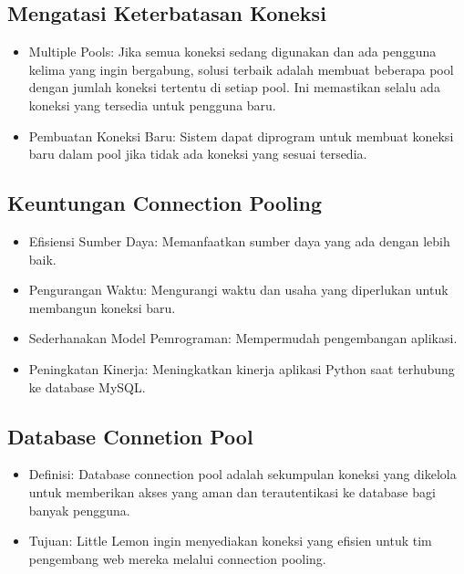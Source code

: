 \documentclass{article}
\begin{document}
\subsection{Mengatasi Keterbatasan Koneksi}
\begin{itemize}
      \item Multiple Pools: Jika semua koneksi sedang digunakan dan ada pengguna kelima yang ingin bergabung, solusi terbaik adalah membuat beberapa pool dengan jumlah koneksi tertentu di setiap pool. Ini memastikan selalu ada koneksi yang tersedia untuk pengguna baru.
      \item Pembuatan Koneksi Baru: Sistem dapat diprogram untuk membuat koneksi baru dalam pool jika tidak ada koneksi yang sesuai tersedia.
\end{itemize}

\subsection{Keuntungan Connection Pooling}
\begin{itemize}
      \item Efisiensi Sumber Daya: Memanfaatkan sumber daya yang ada dengan lebih baik.
      \item Pengurangan Waktu: Mengurangi waktu dan usaha yang diperlukan untuk membangun koneksi baru.
      \item Sederhanakan Model Pemrograman: Mempermudah pengembangan aplikasi.
      \item Peningkatan Kinerja: Meningkatkan kinerja aplikasi Python saat terhubung ke database MySQL.
\end{itemize}

\subsection{Database Connetion Pool}
\begin{itemize}
      \item Definisi: Database connection pool adalah sekumpulan koneksi yang dikelola untuk memberikan akses yang aman dan terautentikasi ke database bagi banyak pengguna.
      \item Tujuan: Little Lemon ingin menyediakan koneksi yang efisien untuk tim pengembang web mereka melalui connection pooling.
\end{itemize}
\end{document}
